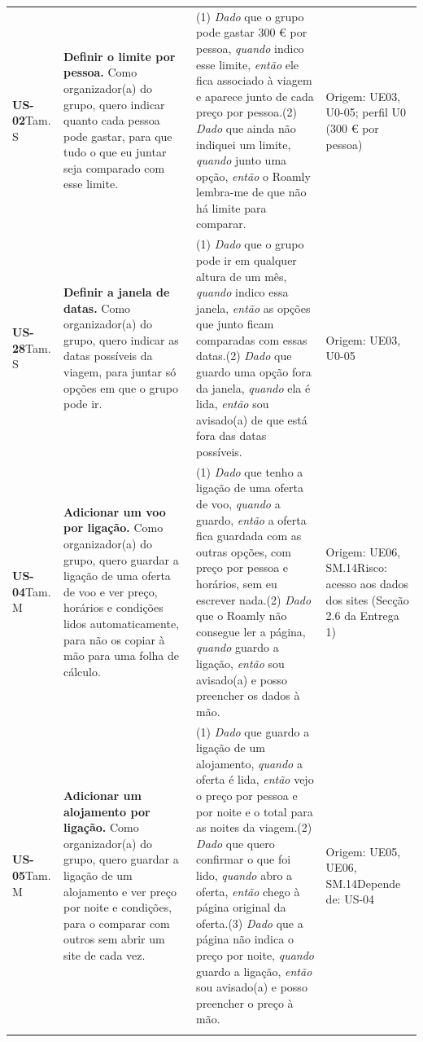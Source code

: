 {\begin{longtable}{@{}p{1.5cm}p{5.1cm}p{5.2cm}p{3.6cm}@{}}
\textbf{US-02}\newline Tam. S & \textbf{Definir o limite por pessoa.} Como organizador(a) do grupo, quero indicar quanto cada pessoa pode gastar, para que tudo o que eu juntar seja comparado com esse limite. & (1) \textit{Dado} que o grupo pode gastar 300 € por pessoa, \textit{quando} indico esse limite, \textit{então} ele fica associado à viagem e aparece junto de cada preço por pessoa.\newline (2) \textit{Dado} que ainda não indiquei um limite, \textit{quando} junto uma opção, \textit{então} o Roamly lembra-me de que não há limite para comparar. & Origem: UE03, U0-05; perfil U0 (300 € por pessoa) \\ \addlinespace
\textbf{US-28}\newline Tam. S & \textbf{Definir a janela de datas.} Como organizador(a) do grupo, quero indicar as datas possíveis da viagem, para juntar só opções em que o grupo pode ir. & (1) \textit{Dado} que o grupo pode ir em qualquer altura de um mês, \textit{quando} indico essa janela, \textit{então} as opções que junto ficam comparadas com essas datas.\newline (2) \textit{Dado} que guardo uma opção fora da janela, \textit{quando} ela é lida, \textit{então} sou avisado(a) de que está fora das datas possíveis. & Origem: UE03, U0-05 \\ \addlinespace
\textbf{US-04}\newline Tam. M & \textbf{Adicionar um voo por ligação.} Como organizador(a) do grupo, quero guardar a ligação de uma oferta de voo e ver preço, horários e condições lidos automaticamente, para não os copiar à mão para uma folha de cálculo. & (1) \textit{Dado} que tenho a ligação de uma oferta de voo, \textit{quando} a guardo, \textit{então} a oferta fica guardada com as outras opções, com preço por pessoa e horários, sem eu escrever nada.\newline (2) \textit{Dado} que o Roamly não consegue ler a página, \textit{quando} guardo a ligação, \textit{então} sou avisado(a) e posso preencher os dados à mão. & Origem: UE06, SM.14\newline Risco: acesso aos dados dos sites (Secção 2.6 da Entrega 1) \\ \addlinespace
\textbf{US-05}\newline Tam. M & \textbf{Adicionar um alojamento por ligação.} Como organizador(a) do grupo, quero guardar a ligação de um alojamento e ver preço por noite e condições, para o comparar com outros sem abrir um site de cada vez. & (1) \textit{Dado} que guardo a ligação de um alojamento, \textit{quando} a oferta é lida, \textit{então} vejo o preço por pessoa e por noite e o total para as noites da viagem.\newline (2) \textit{Dado} que quero confirmar o que foi lido, \textit{quando} abro a oferta, \textit{então} chego à página original da oferta.\newline (3) \textit{Dado} que a página não indica o preço por noite, \textit{quando} guardo a ligação, \textit{então} sou avisado(a) e posso preencher o preço à mão. & Origem: UE05, UE06, SM.14\newline Depende de: US-04 \\ \addlinespace

\end{longtable}}

